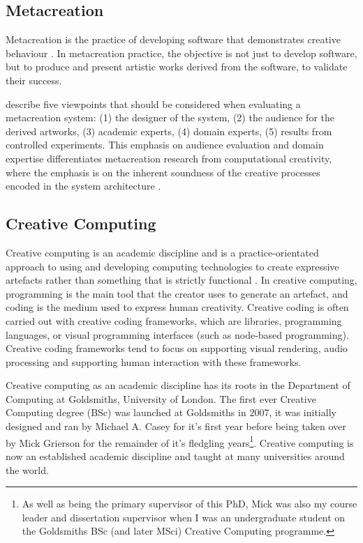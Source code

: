 \subsection{Metacreation}

Metacreation is the practice of developing software that demonstrates creative behaviour \citep{whitelaw2004metacreation}. 
In metacreation practice, the objective is not just to develop software, but to produce and present artistic works derived from the software, to validate their success. 

\cite{eigenfeldt2012evaluating} describe five viewpoints that should be considered when evaluating a metacreation system: (1) the designer of the system, (2) the audience for the derived artworks, (3) academic experts, (4) domain experts, (5) results from controlled experiments.
This emphasis on audience evaluation and domain expertise differentiates metacreation research from computational creativity, where the emphasis is on the inherent soundness of the creative processes encoded in the system architecture \citep{colton2008creativity}.

\subsection{Creative Computing}

Creative computing is an academic discipline and is a practice-orientated approach to using and developing computing technologies to create expressive artefacts rather than something that is strictly functional \citep{yang2016promoting}. 
In creative computing, programming is the main tool that the creator uses to generate an artefact, and coding is the medium used to express human creativity. Creative coding is often carried out with creative coding frameworks, which are libraries, programming languages, or visual programming interfaces (such as node-based programming). 
Creative coding frameworks tend to focus on supporting visual rendering, audio processing and supporting human interaction with these frameworks. 

Creative computing as an academic discipline has its roots in the Department of Computing at Goldsmiths, University of London. 
The first ever Creative Computing degree (BSc) was launched at Goldsmiths in 2007, it was initially designed and ran by Michael A. Casey for it's first year before being taken over by Mick Grierson for the remainder of it's fledgling years\footnote{As well as being the primary supervisor of this PhD, Mick was also my course leader and dissertation supervisor when I was an undergraduate student on the Goldsmiths BSc (and later MSci) Creative Computing programme.}. 
Creative computing is now an established academic discipline and taught at many universities around the world.

